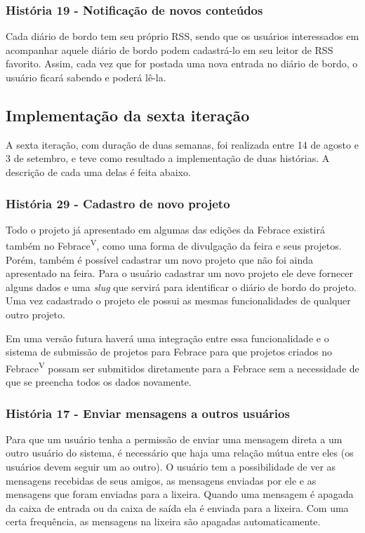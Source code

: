    \subsubsection{História 19 - Notificação de novos conteúdos}
      Cada diário de bordo tem seu próprio RSS, sendo que os usuários interessados em acompanhar aquele diário de bordo podem cadastrá-lo em seu leitor de RSS favorito. Assim, cada vez que for postada uma nova entrada no diário de bordo, o usuário ficará sabendo e poderá lê-la.
      
 \subsection{Implementação da sexta iteração}
    A sexta iteração, com duração de duas semanas, foi realizada entre 14 de agosto e 3 de setembro, e teve como resultado a implementação de duas histórias. A descrição de cada uma delas é feita abaixo.

    \subsubsection{História 29 - Cadastro de novo projeto}
      Todo o projeto já apresentado em algumas das edições da Febrace existirá também no Febrace\textsuperscript{V}, como uma forma de divulgação da feira e seus projetos. Porém, também é possível cadastrar um novo projeto que não foi ainda apresentado na feira. Para o usuário cadastrar um novo projeto ele deve fornecer alguns dados e uma \textit{slug} que servirá para identificar o diário de bordo do projeto. Uma vez cadastrado o projeto ele possui as mesmas funcionalidades de qualquer outro projeto.

      Em uma versão futura haverá uma integração entre essa funcionalidade e o sistema de submissão de projetos para Febrace para que projetos criados no Febrace\textsuperscript{V} possam ser submitidos diretamente para a Febrace sem a necessidade de que se preencha todos os dados novamente.

    \subsubsection{História 17 - Enviar mensagens a outros usuários}
      Para que um usuário tenha a permissão de enviar uma mensagem direta a um outro usuário do sistema, é necessário que haja uma relação mútua entre eles (os usuários devem seguir um ao outro). O usuário tem a possibilidade de ver as mensagens recebidas de seus amigos, as mensagens enviadas por ele e as mensagens que foram enviadas para a lixeira. Quando uma mensagem é apagada da caixa de entrada ou da caixa de saída ela é enviada para a lixeira. Com uma certa frequência, as mensagens na lixeira são apagadas automaticamente.

